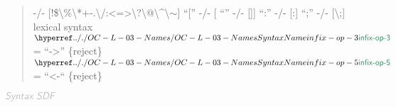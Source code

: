 \begin{quote}
          -/- {[}!\$\textbackslash{}\%\textbackslash{}*+-.\textbackslash{}/:\textless{}=\textgreater{}\textbackslash{}?\textbackslash{}@\textbackslash{}\^{}\textbar{}\textbackslash{}\ensuremath{\sim}{]}\newline
     {}``{[}{}''  -/- {[}\textbar{}{]}\newline
     {}``\textbar{}{}''  -/- {[}{]}{]}\newline
     {}``:{}''  -/- {[}:{]}\newline
     {}``;{}''  -/- {[}\textbackslash{};{]}\newline
   \newline
   lexical syntax\newline
   \newline
     $\SHADE{\SYNHYPER{../.}{OC-L-03-Names}{infix-op-3}}$ = {}``-\textgreater{}{}'' \{reject\}\newline
   \newline
     $\SHADE{\SYNHYPER{../.}{OC-L-03-Names}{infix-op-5}}$ = {}``\textless{}-{}`` \{reject\}
\end{quote}

$\KEY{Syntax SDF}$

